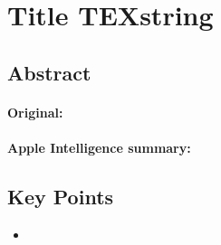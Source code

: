 \documentclass[a4paper,12pt]{article}
\begin{document}
\pagebreak
\section{Title \texorpdfstring{TEXstring}{}}
\label{sec:}

\subsection{Abstract}

\paragraph{Original:}

\paragraph{Apple Intelligence summary:}


\subsection{Key Points}

\begin{itemize}
    \item 
\end{itemize}


\pagebreak
\printbibliography
\end{document}
